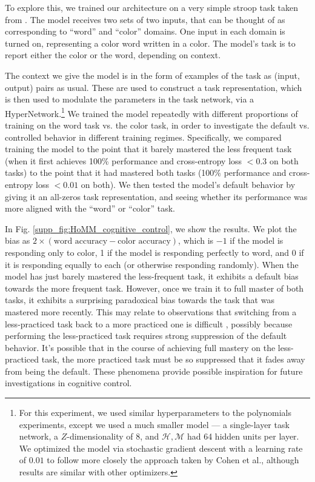To explore this, we trained our architecture on a very simple stroop task taken from \citet{Cohen1990}. The model receives two sets of two inputs, that can be thought of as corresponding to ``word'' and ``color'' domains. One input in each domain is turned on, representing a color word written in a color. The model's task is to report either the color or the word, depending on context.

The context we give the model is in the form of examples of the task as (input, output) pairs as usual. These are used to construct a task representation, which is then used to modulate the parameters in the task network, via a HyperNetwork.\footnote{For this experiment, we used similar hyperparameters to the polynomials experiments, except we used a much smaller model --- a single-layer task network, a $Z$-dimensionality of 8, and $\mathcal{H}, \mathcal{M}$ had 64 hidden units per layer. We optimized the model via stochastic gradient descent with a learning rate of \(0.01\) to follow more closely the approach taken by Cohen et al., although results are similar with other optimizers.} We trained the model repeatedly with different proportions of training on the word task vs. the color task, in order to investigate the default vs. controlled behavior in different training regimes. Specifically, we compared training the model to the point that it barely mastered the less frequent task (when it first achieves 100\% performance and cross-entropy loss \(< 0.3\) on both tasks) to the point that it had mastered both tasks (100\% performance and cross-entropy loss \(<0.01\) on both). We then tested the model's default behavior by giving it an all-zeros task representation, and seeing whether its performance was more aligned with the ``word'' or ``color'' task.

In Fig. \ref{supp_fig:HoMM_cognitive_control}, we show the results. We plot the bias as \(2 \times (\text{word accuracy} - \text{color accuracy})\), which is \(-1\) if the model is responding only to color, 1 if the model is responding perfectly to word, and 0 if it is responding equally to each (or otherwise responding randomly). When the model has just barely mastered the less-frequent task, it exhibits a default bias towards the more frequent task. However, once we train it to full master of both tasks, it exhibits a surprising paradoxical bias towards the task that was mastered more recently. This may relate to observations that switching from a less-practiced task back to a more practiced one is difficult \citep{Monsell2003}, possibly because performing the less-practiced task requires strong suppression of the default behavior. It's possible that in the course of achieving full mastery on the less-practiced task, the more practiced task must be so suppressed that it fades away from being the default. These phenomena provide possible inspiration for future investigations in cognitive control.


